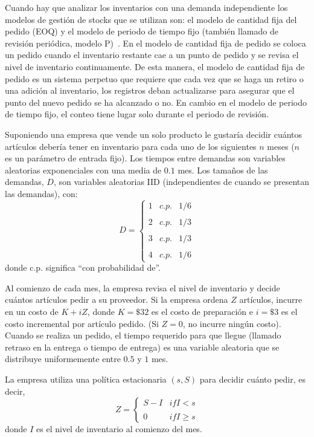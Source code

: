 Cuando hay que analizar los inventarios con una demanda independiente los modelos de
gestión de stocks que se utilizan son: el modelo de cantidad fija del pedido (EOQ) y el
modelo de periodo de tiempo fijo (también llamado de revisión periódica, modelo P)~\cite{chase2004administracion,krajewski2008administracion}.
En el modelo de cantidad fija de pedido se coloca un pedido cuando el inventario restante cae a
un punto de pedido y se revisa el nivel de inventario continuamente.
De esta manera, el modelo de cantidad fija de pedido es un sistema perpetuo que requiere que cada
vez que se haga un retiro o una adición al inventario, los registros deban actualizarse para
asegurar que el punto del nuevo pedido se ha alcanzado o no.
En cambio en el modelo de periodo de
tiempo fijo, el conteo tiene lugar solo durante el periodo de revisión.

Suponiendo una empresa que vende un solo producto le gustaría decidir cuántos artículos debería
tener en inventario para cada uno de los siguientes $n$ meses ($n$ es un parámetro de entrada fijo).
Los tiempos entre demandas son variables aleatorias exponenciales con una media de $0.1$ mes.
Los tamaños de las demandas, $D$, son variables aleatorias IID (independientes de cuando se presentan
las demandas), con:
\begin{equation}
  \label{eq:equation9}
  D=\left\{ \begin{array}{lcc}
            1 &   c.p.  & 1/6 \\
            \\ 2 &  c.p. & 1/3 \\
            \\ 3 &  c.p. & 1/3 \\
            \\ 4 &  c.p.  & 1/6
  \end{array}
  \right.
\end{equation}
donde c.p. significa ``con probabilidad de''.

Al comienzo de cada mes, la empresa revisa el nivel de inventario y decide cuántos artículos pedir
a su proveedor.
Si la empresa ordena $Z$ artículos, incurre en un costo de $K + iZ$, donde $K = \$32$ es el costo de
preparación e $i = \$3$ es el costo incremental por artículo pedido.
(Si $Z = 0$, no incurre ningún costo).
Cuando se realiza un pedido, el tiempo requerido para que llegue (llamado retraso en la entrega
o tiempo de entrega) es una variable aleatoria que se distribuye uniformemente entre $0.5$ y $1$ mes.

La empresa utiliza una política estacionaria $(s, S)$ para decidir cuánto pedir, es decir,
\begin{equation}
  \label{eq:equation10}
  Z = \left\{ \begin{array}{lcc}
                S-I & if I < s \\
                \\ 0 & if I \geq s
  \end{array}
  \right.
\end{equation}
donde $I$ es el nivel de inventario al comienzo del mes.

